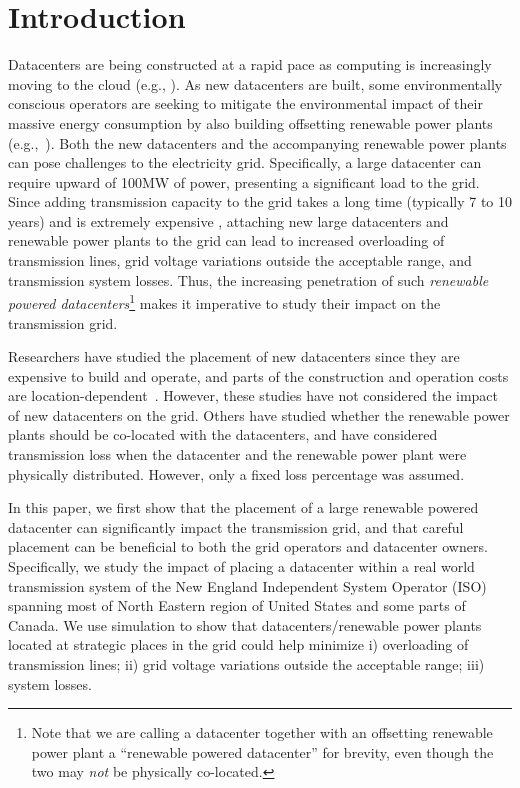 \section{Introduction}
\label{sec:intro}

Datacenters are being constructed at a rapid pace as computing is increasingly moving to the cloud (e.g., \cite{which one?}).  As new datacenters are built, some environmentally conscious operators are seeking to mitigate the environmental impact of their massive energy consumption by also building offsetting renewable power plants (e.g.,~\cite{GoogleGreen,Apple13,McGrawHill11}).  Both the new datacenters and the accompanying renewable power plants can pose challenges to the electricity grid.  Specifically, a large datacenter can require upward of 100MW of power, presenting a significant load to the grid.  Since adding transmission capacity to the grid takes a long time (typically 7 to 10 years) and is extremely expensive \cite{interconnection2010survey}%
, attaching new large datacenters and renewable power plants to the grid can lead to increased overloading of transmission lines, grid voltage variations outside the acceptable range, and transmission system losses.  Thus, the increasing penetration of such {\em renewable powered datacenters}\footnote{Note that we are calling a datacenter together with an offsetting renewable power plant a ``renewable powered datacenter'' for brevity, even though the two may {\em not} be physically co-located.} makes it imperative to study their impact on the transmission grid.

Researchers have studied the placement of new datacenters since they are expensive to build and operate, and parts of the construction and operation costs are location-dependent~\cite{Goiri11place,Dalger05,Boley09,larumbe2012optimal,berral2014building}.  However, these studies have not considered the impact of new datacenters on the grid.  Others have studied whether the renewable power plants should be co-located with the datacenters\cite{gao2013answer}, and have considered transmission loss when the datacenter and the renewable power plant were physically distributed.  However, only a fixed loss percentage was assumed.

In this paper, we first show that the placement of a large renewable powered datacenter can significantly impact the transmission grid, and that careful placement can be beneficial to both the grid operators and datacenter owners.  Specifically, we study the impact of placing a datacenter within a real world transmission system of the New England Independent System Operator (ISO) spanning most of North Eastern region of United States and some parts of Canada.  We use simulation to show that datacenters/renewable power plants located at strategic places in the grid could help minimize i) overloading of transmission lines; ii) grid voltage variations outside the acceptable range; iii) system losses.

